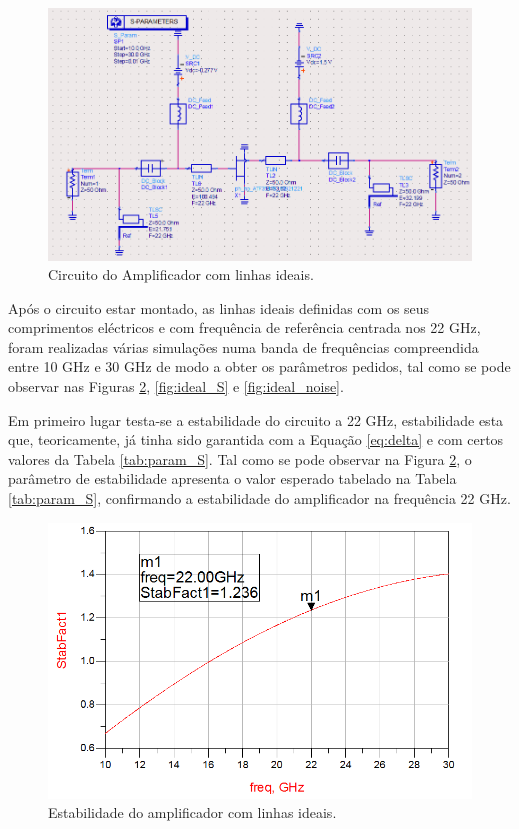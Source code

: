 \documentclass[11pt]{article}
\numberwithin{equation}{section}
\begin{document}
\begin{figure}[H]
	\centering
	\includegraphics[keepaspectratio=true, scale=0.41]{exps/Circuito_ideal}
	\vspace{-0.5em}
	\caption{Circuito do Amplificador com linhas ideais.}
	\vspace{-0.8em}
	\label{fig:circ_ideal}
\end{figure}
 
Após o circuito estar montado, as linhas ideais definidas com os seus comprimentos eléctricos e com frequência de referência centrada nos 22 GHz, foram realizadas várias simulações numa banda de frequências compreendida entre 10 GHz e 30 GHz de modo a obter os parâmetros pedidos, tal como se pode observar nas Figuras \ref{fig:ideal_estavel}, \ref{fig:ideal_S} e \ref{fig:ideal_noise}.

Em primeiro lugar testa-se a estabilidade do circuito a 22 GHz, estabilidade esta que, teoricamente, já tinha sido garantida com a Equação \ref{eq:delta} e com certos valores da Tabela \ref{tab:param_S}. Tal como se pode observar na Figura \ref{fig:ideal_estavel}, o parâmetro de estabilidade apresenta o valor esperado tabelado na Tabela \ref{tab:param_S}, confirmando a estabilidade do amplificador na frequência 22 GHz.

\begin{figure}[H]
	\centering
	\includegraphics[keepaspectratio=true, scale=0.45]{exps/Ideal_estab}
	\vspace{-0.5em}
	\caption{Estabilidade do amplificador com linhas ideais.}
	\vspace{-0.8em}
	\label{fig:ideal_estavel}
\end{figure}
\end{document}
